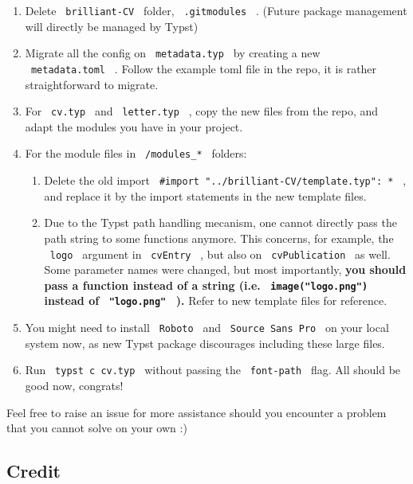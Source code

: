 \begin{enumerate}
\tightlist
\item
  Delete \texttt{\ brilliant-CV\ } folder, \texttt{\ .gitmodules\ } .
  (Future package management will directly be managed by Typst)
\item
  Migrate all the config on \texttt{\ metadata.typ\ } by creating a new
  \texttt{\ metadata.toml\ } . Follow the example toml file in the repo,
  it is rather straightforward to migrate.
\item
  For \texttt{\ cv.typ\ } and \texttt{\ letter.typ\ } , copy the new
  files from the repo, and adapt the modules you have in your project.
\item
  For the module files in \texttt{\ /modules\_*\ } folders:

  \begin{enumerate}
  \tightlist
  \item
    Delete the old import
    \texttt{\ \#import\ "../brilliant-CV/template.typ":\ *\ } , and
    replace it by the import statements in the new template files.
  \item
    Due to the Typst path handling mecanism, one cannot directly pass
    the path string to some functions anymore. This concerns, for
    example, the \texttt{\ logo\ } argument in \texttt{\ cvEntry\ } ,
    but also on \texttt{\ cvPublication\ } as well. Some parameter names
    were changed, but most importantly, \textbf{you should pass a
    function instead of a string (i.e. \texttt{\ image("logo.png")\ }
    instead of \texttt{\ "logo.png"\ } ).} Refer to new template files
    for reference.
  \end{enumerate}
\item
  You might need to install \texttt{\ Roboto\ } and
  \texttt{\ Source\ Sans\ Pro\ } on your local system now, as new Typst
  package discourages including these large files.
\item
  Run \texttt{\ typst\ c\ cv.typ\ } without passing the
  \texttt{\ font-path\ } flag. All should be good now, congrats!
\end{enumerate}

Feel free to raise an issue for more assistance should you encounter a
problem that you cannot solve on your own :)

\subsection{Credit}\label{credit}

